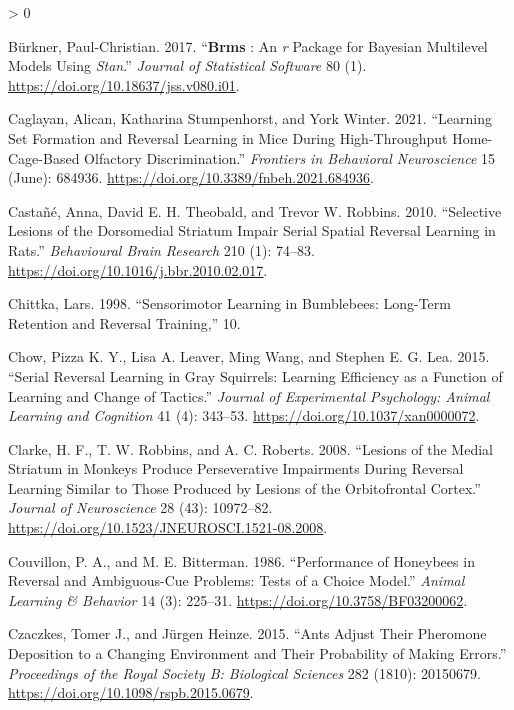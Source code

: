 \documentclass[
]{article}
\newlength{\cslhangindent}
\newenvironment{CSLReferences}[2] %
 {%
  \setlength{\parindent}{0pt}
  \ifodd #1 \everypar{\setlength{\hangindent}{\cslhangindent}}\ignorespaces\fi
  \ifnum #2 > 0
  \setlength{\parskip}{#2\baselineskip}
  \fi
 }%
 {}
\begin{document}
\begin{CSLReferences}{1}{0}
\leavevmode\hypertarget{ref-burkner_brms_2017}{}%
Bürkner, Paul-Christian. 2017. {``\textbf{Brms} : {An} \emph{r} {Package} for {Bayesian} {Multilevel} {Models} {Using} \emph{Stan}.''} \emph{Journal of Statistical Software} 80 (1). \url{https://doi.org/10.18637/jss.v080.i01}.

\leavevmode\hypertarget{ref-caglayan_learning_2021}{}%
Caglayan, Alican, Katharina Stumpenhorst, and York Winter. 2021. {``Learning {Set} {Formation} and {Reversal} {Learning} in {Mice} {During} {High}-{Throughput} {Home}-{Cage}-{Based} {Olfactory} {Discrimination}.''} \emph{Frontiers in Behavioral Neuroscience} 15 (June): 684936. \url{https://doi.org/10.3389/fnbeh.2021.684936}.

\leavevmode\hypertarget{ref-castane_selective_2010}{}%
Castañé, Anna, David E. H. Theobald, and Trevor W. Robbins. 2010. {``Selective Lesions of the Dorsomedial Striatum Impair Serial Spatial Reversal Learning in Rats.''} \emph{Behavioural Brain Research} 210 (1): 74--83. \url{https://doi.org/10.1016/j.bbr.2010.02.017}.

\leavevmode\hypertarget{ref-chittka_sensorimotor_1998}{}%
Chittka, Lars. 1998. {``Sensorimotor Learning in Bumblebees: Long-Term Retention and Reversal Training,''} 10.

\leavevmode\hypertarget{ref-chow_serial_2015}{}%
Chow, Pizza K. Y., Lisa A. Leaver, Ming Wang, and Stephen E. G. Lea. 2015. {``Serial Reversal Learning in Gray Squirrels: {Learning} Efficiency as a Function of Learning and Change of Tactics.''} \emph{Journal of Experimental Psychology: Animal Learning and Cognition} 41 (4): 343--53. \url{https://doi.org/10.1037/xan0000072}.

\leavevmode\hypertarget{ref-clarke_lesions_2008}{}%
Clarke, H. F., T. W. Robbins, and A. C. Roberts. 2008. {``Lesions of the {Medial} {Striatum} in {Monkeys} {Produce} {Perseverative} {Impairments} During {Reversal} {Learning} {Similar} to {Those} {Produced} by {Lesions} of the {Orbitofrontal} {Cortex}.''} \emph{Journal of Neuroscience} 28 (43): 10972--82. \url{https://doi.org/10.1523/JNEUROSCI.1521-08.2008}.

\leavevmode\hypertarget{ref-couvillon_performance_1986}{}%
Couvillon, P. A., and M. E. Bitterman. 1986. {``Performance of Honeybees in Reversal and Ambiguous-Cue Problems: {Tests} of a Choice Model.''} \emph{Animal Learning \& Behavior} 14 (3): 225--31. \url{https://doi.org/10.3758/BF03200062}.

\leavevmode\hypertarget{ref-czaczkes_ants_2015}{}%
Czaczkes, Tomer J., and Jürgen Heinze. 2015. {``Ants Adjust Their Pheromone Deposition to a Changing Environment and Their Probability of Making Errors.''} \emph{Proceedings of the Royal Society B: Biological Sciences} 282 (1810): 20150679. \url{https://doi.org/10.1098/rspb.2015.0679}.


\end{CSLReferences}
\end{document}
